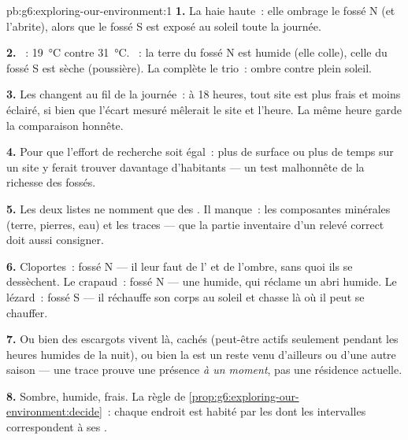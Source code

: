\begin{solution}{pb:g6:exploring-our-environment:1}
\textbf{1.} La haie haute~: elle ombrage le fossé N (et l'abrite),
alors que le fossé S est exposé au soleil toute la journée.

\textbf{2.} ~: \qty{19}{\degreeCelsius} contre
\qty{31}{\degreeCelsius}. ~: la terre du fossé N est humide
(elle colle), celle du fossé S est sèche (poussière). La 
complète le trio~: ombre contre plein soleil.

\textbf{3.} Les  changent au fil de la journée~: à 18
heures, tout site est plus frais et moins éclairé, si bien que
l'écart mesuré mêlerait le site et l'heure. La même heure garde la
comparaison honnête.

\textbf{4.} Pour que l'effort de recherche soit égal~: plus de
surface ou plus de temps sur un site y ferait trouver davantage
d'habitants --- un test malhonnête de la richesse des fossés.

\textbf{5.} Les deux listes ne nomment que des . Il
manque~: les composantes minérales (terre, pierres, eau) et les
traces --- que la partie inventaire d'un relevé correct doit aussi
consigner.

\textbf{6.} Cloportes~: fossé N --- il leur faut de l' et de
l'ombre, sans quoi ils se dessèchent. Le crapaud~: fossé N --- une
 humide, qui réclame un abri humide. Le lézard~: fossé S --- il
réchauffe son corps au soleil et chasse là où il peut se chauffer.

\textbf{7.} Ou bien des escargots vivent là, cachés (peut-être
actifs seulement pendant les heures humides de la nuit), ou bien la
 est un reste venu d'ailleurs ou d'une autre saison --- une
trace prouve une présence \emph{à un moment}, pas une résidence
actuelle.

\textbf{8.} Sombre, humide, frais. La règle de
\cref{prop:g6:exploring-our-environment:decide}~: chaque endroit est
habité par les  dont les intervalles correspondent à ses
.


\end{solution}
